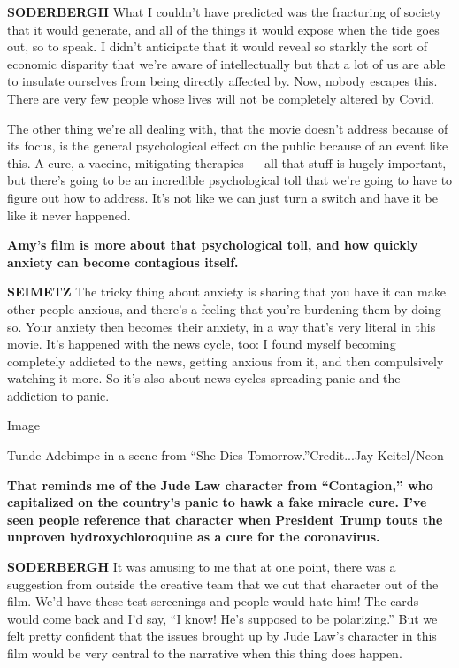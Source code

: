 \textbf{SODERBERGH} What I couldn't have predicted was the fracturing of
society that it would generate, and all of the things it would expose
when the tide goes out, so to speak. I didn't anticipate that it would
reveal so starkly the sort of economic disparity that we're aware of
intellectually but that a lot of us are able to insulate ourselves from
being directly affected by. Now, nobody escapes this. There are very few
people whose lives will not be completely altered by Covid.

The other thing we're all dealing with, that the movie doesn't address
because of its focus, is the general psychological effect on the public
because of an event like this. A cure, a vaccine, mitigating therapies
--- all that stuff is hugely important, but there's going to be an
incredible psychological toll that we're going to have to figure out how
to address. It's not like we can just turn a switch and have it be like
it never happened.

\textbf{Amy's film is more about that psychological toll, and how
quickly anxiety can become contagious itself.}

\textbf{SEIMETZ} The tricky thing about anxiety is sharing that you have
it can make other people anxious, and there's a feeling that you're
burdening them by doing so. Your anxiety then becomes their anxiety, in
a way that's very literal in this movie. It's happened with the news
cycle, too: I found myself becoming completely addicted to the news,
getting anxious from it, and then compulsively watching it more. So it's
also about news cycles spreading panic and the addiction to panic.

Image

Tunde Adebimpe in a scene from ``She Dies Tomorrow.''Credit...Jay
Keitel/Neon

\textbf{That reminds me of the Jude Law character from ``Contagion,''
who capitalized on the country's panic to hawk a fake miracle cure. I've
seen people reference that character when President Trump touts the
unproven hydroxychloroquine as a cure for the coronavirus.}

\textbf{SODERBERGH} It was amusing to me that at one point, there was a
suggestion from outside the creative team that we cut that character out
of the film. We'd have these test screenings and people would hate him!
The cards would come back and I'd say, ``I know! He's supposed to be
polarizing.'' But we felt pretty confident that the issues brought up by
Jude Law's character in this film would be very central to the narrative
when this thing does happen.


